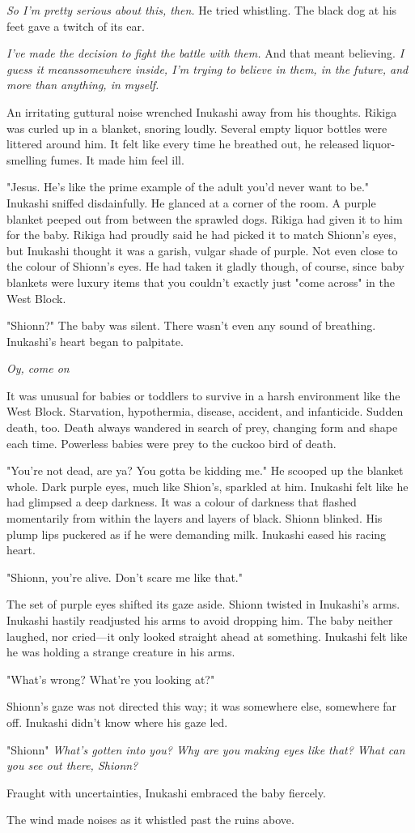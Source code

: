 \emph{So I'm pretty serious about this, then.} He tried whistling. The black
dog at his feet gave a twitch of its ear.

\emph{I've made the decision to fight the battle with them.} And that meant
believing. \emph{I guess it means\el somewhere inside, I'm trying to believe
in them, in the future, and more than anything, in myself.}

An irritating guttural noise wrenched Inukashi away from his thoughts.
Rikiga was curled up in a blanket, snoring loudly. Several empty liquor
bottles were littered around him. It felt like every time he breathed
out, he released liquor-smelling fumes. It made him feel ill.

"Jesus. He's like the prime example of the adult you'd never want to
be." Inukashi sniffed disdainfully. He glanced at a corner of the room.
A purple blanket peeped out from between the sprawled dogs. Rikiga had
given it to him for the baby. Rikiga had proudly said he had picked it
to match Shionn's eyes, but Inukashi thought it was a garish, vulgar
shade of purple. Not even close to the colour of Shionn's eyes. He had
taken it gladly though, of course, since baby blankets were luxury items
that you couldn't exactly just "come across" in the West Block.

"Shionn?" The baby was silent. There wasn't even any sound of breathing.
Inukashi's heart began to palpitate.

\emph{Oy, come on\el }

It was unusual for babies or toddlers to survive in a harsh environment
like the West Block. Starvation, hypothermia, disease, accident, and
infanticide. Sudden death, too. Death always wandered in search of prey,
changing form and shape each time. Powerless babies were prey to the
cuckoo bird of death.

"You're not dead, are ya? You gotta be kidding me." He scooped up the
blanket whole. Dark purple eyes, much like Shion's, sparkled at him.
Inukashi felt like he had glimpsed a deep darkness. It was a colour of
darkness that flashed momentarily from within the layers and layers of
black. Shionn blinked. His plump lips puckered as if he were demanding
milk. Inukashi eased his racing heart.

"Shionn, you're alive. Don't scare me like that."

The set of purple eyes shifted its gaze aside. Shionn twisted in
Inukashi's arms. Inukashi hastily readjusted his arms to avoid dropping
him. The baby neither laughed, nor cried---it only looked straight ahead
at something. Inukashi felt like he was holding a strange creature in
his arms.

"What's wrong? What're you looking at?"

Shionn's gaze was not directed this way; it was somewhere else,
somewhere far off. Inukashi didn't know where his gaze led.

"Shionn\el " \emph{What's gotten into you? Why are you making eyes like that?
What can you see out there, Shionn?}

Fraught with uncertainties, Inukashi embraced the baby fiercely.

The wind made noises as it whistled past the ruins above.